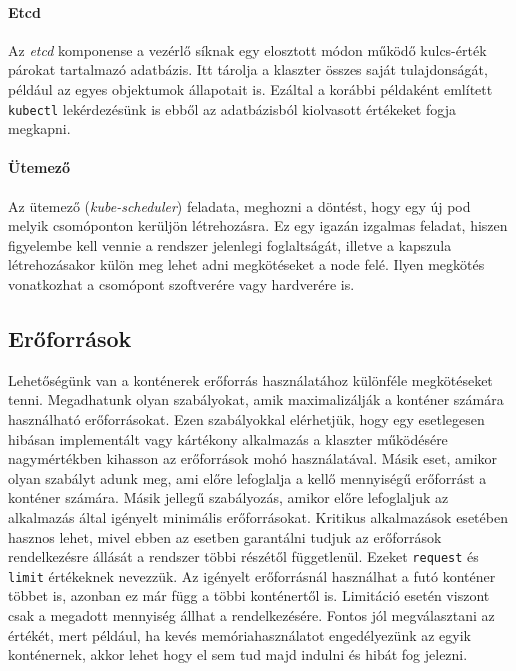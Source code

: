 \paragraph{Etcd} Az \textit{etcd} komponense a vezérlő síknak egy elosztott módon működő\citep{raft} kulcs-érték párokat tartalmazó adatbázis. Itt tárolja a klaszter összes saját tulajdonságát, például az egyes objektumok állapotait is. Ezáltal a korábbi példaként említett \verb+kubectl+ lekérdezésünk is ebből az adatbázisból kiolvasott értékeket fogja megkapni.

\paragraph{Ütemező} Az ütemező (\textit{kube-scheduler}) feladata, meghozni a döntést, hogy egy új pod melyik csomóponton kerüljön létrehozásra. Ez egy igazán izgalmas feladat, hiszen figyelembe kell vennie a rendszer jelenlegi foglaltságát, illetve a kapszula létrehozásakor külön meg lehet adni megkötéseket a node felé. Ilyen megkötés vonatkozhat a csomópont szoftverére vagy hardverére is. 

\subsection{Erőforrások}
Lehetőségünk van a konténerek erőforrás használatához különféle megkötéseket tenni. 
Megadhatunk olyan szabályokat, amik maximalizálják a konténer számára használható erőforrásokat.
Ezen szabályokkal elérhetjük, hogy egy esetlegesen hibásan implementált vagy kártékony alkalmazás a klaszter működésére nagymértékben kihasson az erőforrások mohó használatával.
Másik eset, amikor olyan szabályt adunk meg, ami előre lefoglalja a kellő mennyiségű erőforrást a konténer számára.
Másik jellegű szabályozás, amikor előre lefoglaljuk az alkalmazás által igényelt minimális erőforrásokat.
Kritikus alkalmazások esetében hasznos lehet, mivel ebben az esetben garantálni tudjuk az erőforrások rendelkezésre állását a rendszer többi részétől függetlenül.
Ezeket \verb+request+  és \verb+limit+ értékeknek nevezzük.
Az igényelt erőforrásnál használhat a futó konténer többet is, azonban ez már függ a többi konténertől is.
Limitáció esetén viszont csak a megadott mennyiség állhat a rendelkezésére.
Fontos jól megválasztani az értékét, mert például, ha kevés memóriahasználatot engedélyezünk az egyik konténernek, akkor lehet hogy el sem tud majd indulni és hibát fog jelezni.

